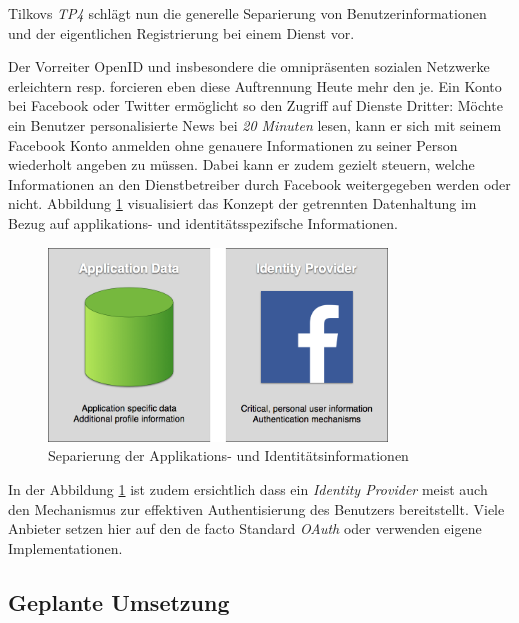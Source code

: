 Tilkovs \emph{TP4} schlägt nun die generelle Separierung von Benutzerinformationen und der eigentlichen Registrierung bei einem Dienst vor.

Der Vorreiter OpenID \cite{OpenID} und insbesondere die omnipräsenten sozialen Netzwerke erleichtern resp. forcieren eben diese Auftrennung Heute mehr den je.
\newline\newline
Ein Konto bei Facebook oder Twitter ermöglicht so den Zugriff auf Dienste Dritter: Möchte ein Benutzer personalisierte News bei \emph{20 Minuten} lesen, kann er sich mit seinem Facebook Konto anmelden \cite{20min} ohne genauere Informationen zu seiner Person wiederholt angeben zu müssen. Dabei kann er zudem gezielt steuern, welche Informationen an den Dienstbetreiber durch Facebook weitergegeben werden oder nicht.
\newline\newline
Abbildung \ref{fig:applicationdata-vs-identityprovider} visualisiert das Konzept der getrennten Datenhaltung im Bezug auf applikations- und identitätsspezifsche Informationen.

\begin{figure}[H]
	\centering
	\includegraphics[width=9cm]{content/principle-demonstration/images/applicationdata-vs-identityprovider.png}
	\caption{Separierung der Applikations- und Identitätsinformationen}
	\label{fig:applicationdata-vs-identityprovider}
\end{figure}

In der Abbildung \ref{fig:applicationdata-vs-identityprovider} ist zudem ersichtlich dass ein \emph{Identity Provider} meist auch den Mechanismus zur effektiven Authentisierung des Benutzers bereitstellt. Viele Anbieter setzen hier auf den de facto Standard \emph{OAuth} \cite{oauth} oder verwenden eigene Implementationen.


\subsection*{Geplante Umsetzung}

